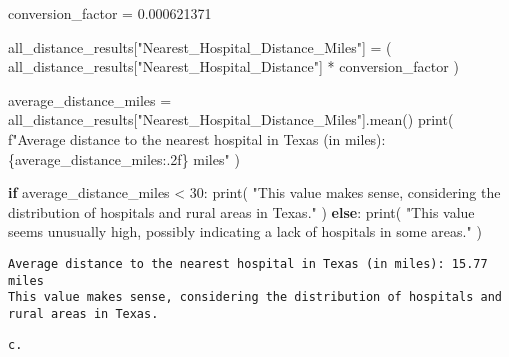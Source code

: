\documentclass[
  letterpaper,
  DIV=11,
  numbers=noendperiod]{scrartcl}
\newenvironment{Shaded}{\begin{snugshade}}{\end{snugshade}}
\newcommand{\BuiltInTok}[1]{\textcolor[rgb]{0.00,0.23,0.31}{#1}}
\newcommand{\ControlFlowTok}[1]{\textcolor[rgb]{0.00,0.23,0.31}{\textbf{#1}}}
\newcommand{\DecValTok}[1]{\textcolor[rgb]{0.68,0.00,0.00}{#1}}
\newcommand{\FloatTok}[1]{\textcolor[rgb]{0.68,0.00,0.00}{#1}}
\newcommand{\NormalTok}[1]{\textcolor[rgb]{0.00,0.23,0.31}{#1}}
\newcommand{\OperatorTok}[1]{\textcolor[rgb]{0.37,0.37,0.37}{#1}}
\newcommand{\SpecialCharTok}[1]{\textcolor[rgb]{0.37,0.37,0.37}{#1}}
\newcommand{\SpecialStringTok}[1]{\textcolor[rgb]{0.13,0.47,0.30}{#1}}
\newcommand{\StringTok}[1]{\textcolor[rgb]{0.13,0.47,0.30}{#1}}
\begin{document}
\begin{Shaded}
\begin{Highlighting}[]
\NormalTok{conversion\_factor }\OperatorTok{=} \FloatTok{0.000621371}

\NormalTok{all\_distance\_results[}\StringTok{"Nearest\_Hospital\_Distance\_Miles"}\NormalTok{] }\OperatorTok{=}\NormalTok{ (}
\NormalTok{    all\_distance\_results[}\StringTok{"Nearest\_Hospital\_Distance"}\NormalTok{] }\OperatorTok{*}\NormalTok{ conversion\_factor}
\NormalTok{)}

\NormalTok{average\_distance\_miles }\OperatorTok{=}\NormalTok{ all\_distance\_results[}\StringTok{"Nearest\_Hospital\_Distance\_Miles"}\NormalTok{].mean()}
\BuiltInTok{print}\NormalTok{(}
    \SpecialStringTok{f"Average distance to the nearest hospital in Texas (in miles): }\SpecialCharTok{\{}\NormalTok{average\_distance\_miles}\SpecialCharTok{:.2f\}}\SpecialStringTok{ miles"}
\NormalTok{)}

\ControlFlowTok{if}\NormalTok{ average\_distance\_miles }\OperatorTok{\textless{}} \DecValTok{30}\NormalTok{:}
    \BuiltInTok{print}\NormalTok{(}
        \StringTok{"This value makes sense, considering the distribution of hospitals and rural areas in Texas."}
\NormalTok{    )}
\ControlFlowTok{else}\NormalTok{:}
    \BuiltInTok{print}\NormalTok{(}
        \StringTok{"This value seems unusually high, possibly indicating a lack of hospitals in some areas."}
\NormalTok{    )}
\end{Highlighting}
\end{Shaded}

\begin{verbatim}
Average distance to the nearest hospital in Texas (in miles): 15.77 miles
This value makes sense, considering the distribution of hospitals and rural areas in Texas.
\end{verbatim}

\begin{verbatim}
c.
\end{verbatim}
\end{document}
